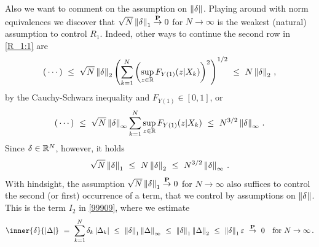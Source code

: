 \begin{remark}
  Also we want to comment on the assumption on $\left\lVert\delta\right\rVert$.
  Playing around with norm equivalences we discover that 
  $\sqrt{N}\left\lVert\delta\right\rVert_1\overset{\mathbf{P}}{\to}0$ for $N\to \infty$ is the weakest
  (natural) assumption to
  control $R_1$.
  Indeed, other ways to continue the second row in \eqref{R_1:1} are
  \begin{gather*}
    (\,\cdots)
    \ 
  \le
    \ 
  \sqrt{N}
  \norm{\delta}_2
  \left( 
  \sum_{k=1}^{N} 
  \left( 
    \sup_{z\in\R}
  F_{Y(1)}(z|X_k)
  \right)^2
\right)^{1/2}
\ 
\le
\ 
N
  \norm{\delta}_2\,,
  \end{gather*}
  by the Cauchy-Schwarz inequality and
  $
  F_{Y(1)}\in [0,1]
  $,
or
\begin{gather*}
  (\,\cdots)
  \ 
  \le
  \ 
  \sqrt{N}
  \norm{\delta}_\infty
  \sum_{k=1}^{N} 
    \sup_{z\in\R}
  F_{Y(1)}(z|X_k)
  \ 
  \le
  \ 
  N^{3/2}
  \norm{\delta}_\infty
  \,.
\end{gather*}
Since $\delta\in \mathbb{R}^N$, however, it holds
\begin{gather*}
  \sqrt{N}\norm{\delta}_1
  \ 
  \le
  \ 
  N\norm{\delta}_2
  \ 
  \le
  \ 
  N^{3/2}\norm{\delta}_\infty
  \,.
\end{gather*}
With hindsight, the assumption 
$\sqrt{N}\left\lVert\delta\right\rVert_1\overset{\mathbf{P}}{\to}0$ for $N\to \infty$ 
  also 
  suffices 
  to control the second (or first) occurrence of a term, that we control by assumptions on $\left\lVert\delta\right\rVert$.
This is the term $I_2$ in \eqref{99909}, where we estimate
\begin{gather*}
  \inner{\delta}{\left| \Delta \right|}
  \ 
  =
  \ 
  \sum_{k=1}^{N} 
  \delta_k
  \left| \Delta_k \right|
  \ 
  \le
  \ 
  \norm{\delta}_1
  \norm{\Delta}_\infty
  \ 
  \le
  \ 
  \norm{\delta}_1
  \norm{\Delta}_2
  \ 
  \le
  \ 
  \norm{\delta}_1
  \varepsilon
  \ 
  \overset{\P}{\to}
  \ 
  0
  \quad
  \text{for}\ 
  N\to \infty
  \,.
\end{gather*}

\end{remark}

